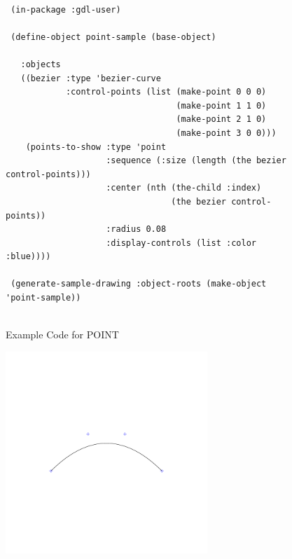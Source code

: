 \documentclass [11pt]{book}
\begin{document}
\begin{itemize}
\begin{figure}
\begin{lrbox}{\boxedverb}
\begin{minipage}{\linewidth}
{\small

\begin{verbatim}

 (in-package :gdl-user)

 (define-object point-sample (base-object)
   
   :objects
   ((bezier :type 'bezier-curve
            :control-points (list (make-point 0 0 0)
                                  (make-point 1 1 0)
                                  (make-point 2 1 0)
                                  (make-point 3 0 0)))
    (points-to-show :type 'point
                    :sequence (:size (length (the bezier control-points)))
                    :center (nth (the-child :index) 
                                 (the bezier control-points))
                    :radius 0.08
                    :display-controls (list :color :blue))))

 (generate-sample-drawing :object-roots (make-object 'point-sample))


\end{verbatim}}
\end{minipage}
\end{lrbox}
\fbox{\usebox{\boxedverb}}

\caption{Example Code for POINT}

\label{fig:example-code-POINT}

\end{figure}

\begin{figure}
\begin{center}
\includegraphics[width=3in,height=3in]{../images/example-POINT.pdf}
\end{center}


\end{figure}
\end{itemize}
\end{document}
